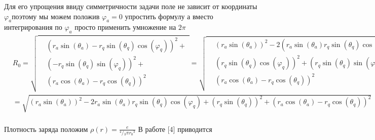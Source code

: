 ﻿\documentclass{article}
\begin{document}
Для его упрощения ввиду симметричности задачи поле не зависит от координаты ${{\varphi }_{a}}$поэтому мы можем положив ${{\varphi }_{a}}=0$ упростить формулу а вместо интегрирования по ${{\varphi }_{a}}$ просто применить умножение на $2\pi $ 
$\begin{align}
  & {{R}_{0}}=\sqrt{\begin{align}
  & {{\left( {{r}_{a}}\sin \left( {{\theta }_{a}} \right)-{{r}_{q}}\sin \left( {{\theta }_{q}} \right)\cos \left( {{\varphi }_{q}} \right) \right)}^{2}}+ \\ 
 & {{\left( -{{r}_{q}}\sin \left( {{\theta }_{q}} \right)\sin \left( {{\varphi }_{q}} \right) \right)}^{2}}+ \\ 
 & {{\left( {{r}_{a}}\cos \left( {{\theta }_{a}} \right)-{{r}_{q}}\cos \left( {{\theta }_{q}} \right) \right)}^{2}} \\ 
\end{align}}=\sqrt{\begin{align}
  & {{\left( {{r}_{a}}\sin \left( {{\theta }_{a}} \right) \right)}^{2}}-2\left( {{r}_{a}}\sin \left( {{\theta }_{a}} \right){{r}_{q}}\sin \left( {{\theta }_{q}} \right)\cos \left( {{\varphi }_{q}} \right) \right)+ \\ 
 & {{\left( {{r}_{q}}\sin \left( {{\theta }_{q}} \right)\cos \left( {{\varphi }_{q}} \right) \right)}^{2}}+{{\left( {{r}_{q}}\sin \left( {{\theta }_{q}} \right)\sin \left( {{\varphi }_{q}} \right) \right)}^{2}}+ \\ 
 & {{\left( {{r}_{a}}\cos \left( {{\theta }_{a}} \right)-{{r}_{q}}\cos \left( {{\theta }_{q}} \right) \right)}^{2}} \\ 
\end{align}} \\ 
 & =\sqrt{{{\left( {{r}_{a}}\sin \left( {{\theta }_{a}} \right) \right)}^{2}}-2{{r}_{a}}\sin \left( {{\theta }_{a}} \right){{r}_{q}}\sin \left( {{\theta }_{q}} \right)\cos \left( {{\varphi }_{q}} \right)+{{\left( {{r}_{q}}\sin \left( {{\theta }_{q}} \right) \right)}^{2}}+{{\left( {{r}_{a}}\cos \left( {{\theta }_{a}} \right)-{{r}_{q}}\cos \left( {{\theta }_{q}} \right) \right)}^{2}}} \\ 
\end{align}$

Плотность заряда положим $\rho \left( r \right)=\frac{e}{{}^{4}/{}_{3}\pi {{r}_{0}}^{3}}$ 
В работе [4] приводится 

\end{document}

